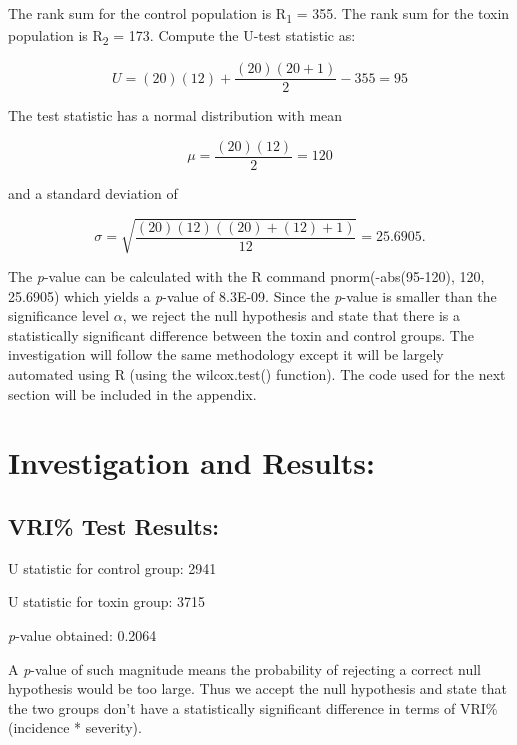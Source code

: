 \documentclass[11pt]{article}
\begin{document}
 

The rank sum for the control population is R\textsubscript{1} = 355. The rank sum for the toxin population is R\textsubscript{2} = 173. Compute the U-test statistic as:

\begin{equation*}
U = (20)(12) + \frac{(20)(20 + 1)}{2} - 355 = 95
\end{equation*}

The test statistic has a normal distribution with mean 

\begin{equation*}
\mu{} = \frac{(20)(12)}{2} = 120
\end{equation*}

and a standard deviation of

\begin{equation*}
\sigma{} = \sqrt{\frac{(20)(12)((20) + (12) + 1)}{12}} = 25.6905.
\end{equation*}

The \textit{p}-value can be calculated with the R command pnorm(-abs(95-120), 120, 25.6905) which yields a \textit{p}-value of 8.3E-09. Since the \textit{p}-value is smaller than the significance level \(\alpha\),
we reject the null hypothesis and state that there is a statistically significant difference between the toxin and control groups. The investigation will follow the same methodology except it will be largely automated using R (using the wilcox.test() function). The code used for the next section will be included in the appendix.
\section{Investigation and Results:}
\label{sec:orgd4f2a86}
\subsection{VRI\% Test Results:}
\label{sec:org0a9e025}
\noindent
U statistic for control group: 2941

\noindent
U statistic for toxin group: 3715

\noindent
\textit{p}-value obtained: 0.2064

A \textit{p}-value of such magnitude means the probability of rejecting a correct null hypothesis would be too large. Thus we accept the null hypothesis and state that the two groups don't have a statistically significant difference in terms of VRI\% (incidence * severity).
\end{document}
